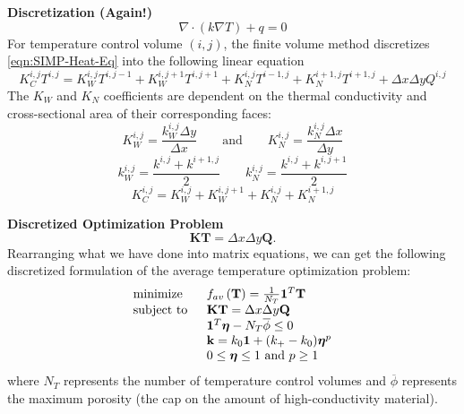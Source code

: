 \documentclass[final]{beamer}
\begin{document}
\begin{frame}{\textbf{Discretization (Again!)}}
	\begin{equation}
		\nabla\cdot\left(k\nabla T\right)+q=0\label{eqn:SIMP-Heat-Eq}
	\end{equation}\pause
	For temperature control volume $(i,j)$, the finite volume method discretizes \eqref{eqn:SIMP-Heat-Eq} into the following linear equation
	{\small
		\begin{equation}
			K^{i,j}_C T^{i,j}=K_W^{i,j}T^{i,j-1}+K_W^{i,j+1}T^{i,j+1}+K_N^{i,j}T^{i-1,j}+K_N^{i+1,j}T^{i+1,j}+\Delta x\Delta y Q^{i,j}\label{eqn:FVM-Discret}
		\end{equation}}\pause
	The $K_W$ and $K_N$ coefficients are dependent on the thermal conductivity and cross-sectional area of their corresponding faces:
	\begin{equation}
		K_W^{i,j}=\frac{k_W^{i,j}\Delta y}{\Delta x}\qquad\text{and}\qquad K_N^{i,j}=\frac{k_N^{i,j}\Delta x}{\Delta y}\label{eqn:K-Coeffs}
	\end{equation}
	\begin{equation}
		k^{i,j}_W=\frac{k^{i,j}+k^{i+1,j}}{2}\qquad k^{i,j}_N=\frac{k^{i,j}+k^{i,j+1}}{2}
	\end{equation}\pause
	\begin{equation}
		K^{i,j}_C=K_W^{i,j}+K_W^{i,j+1}+K_N^{i,j}+K_N^{i+1,j}\label{eqn:CenterFluxCoeff}
	\end{equation}
\end{frame}

\begin{frame}{\textbf{Discretized Optimization Problem}}
	\begin{equation}
		\mathbf{K}\mathbf{T}=\Delta x\Delta y\mathbf{Q}.\label{eqn:KTQ-Matrix-Eqn}
	\end{equation}\pause
	Rearranging what we have done into matrix equations, we can get the following discretized formulation of the average temperature optimization problem:
	\begin{equation}
		\begin{tabular}{ll}
			$\text{minimize}$  & $f_{av}\left({\mathbf{T}}\right)=\frac{1}{N_T}\mathbf{1}^T\mathbf{T}$                                                                                     \\
			\text{subject to } & $\mathbf{K}\mathbf{T}=\Delta x\Delta y\mathbf{Q}$                                                                   \\
			& $\mathbf{1}^T\boldsymbol{\eta}-N_T\overline{\phi}\leq0$ \\
			& $\mathbf{k}=k_0\mathbf{1}+(k_+-k_0)\boldsymbol{\eta}^p$                                       \\
			& $0\leq\boldsymbol{\eta}\leq 1\text{ and } p\geq 1$
		\end{tabular}\label{Implementation-SIMP-Optimization-Problem}
	\end{equation}
	where $N_T$ represents the number of temperature control volumes and $\overline{\phi}$ represents the maximum porosity (the cap on the amount of high-conductivity material).
\end{frame}
\end{document}
